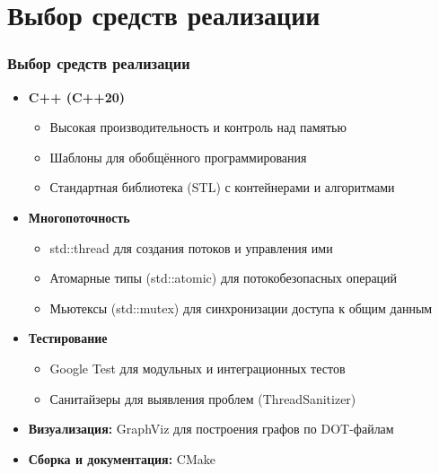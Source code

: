 \documentclass[aspectratio=169]{beamer}
\begin{document}
\section{Выбор средств реализации}
\begin{frame}
  \frametitle{Выбор средств реализации}
  \begin{itemize}
    \item \textbf{C++ (C++20)}
      \begin{itemize}
        \item Высокая производительность и контроль над памятью
        \item Шаблоны для обобщённого программирования
        \item Стандартная библиотека (STL) с контейнерами и алгоритмами
      \end{itemize}
    \item \textbf{Многопоточность}
      \begin{itemize}
        \item std::thread для создания потоков и управления ими
        \item Атомарные типы (std::atomic) для потокобезопасных операций
        \item Мьютексы (std::mutex) для синхронизации доступа к общим данным
      \end{itemize}
    \item \textbf{Тестирование}
      \begin{itemize}
        \item Google Test для модульных и интеграционных тестов
        \item Санитайзеры для выявления проблем (ThreadSanitizer)
      \end{itemize}
    \item \textbf{Визуализация:} GraphViz для построения графов по DOT-файлам
    \item \textbf{Сборка и документация:} CMake
  \end{itemize}
\end{frame}

\end{document}
